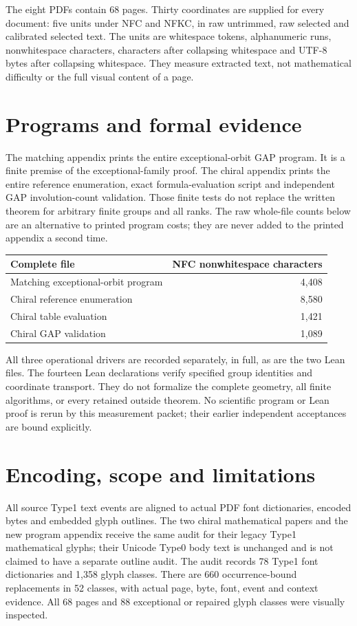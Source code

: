 \documentclass[11pt,a4paper]{article}
\begin{document}
The eight PDFs contain 68 pages. Thirty coordinates are supplied for every document: five units under NFC and NFKC, in raw untrimmed, raw selected and calibrated selected text. The units are whitespace tokens, alphanumeric runs, nonwhitespace characters, characters after collapsing whitespace and UTF-8 bytes after collapsing whitespace. They measure extracted text, not mathematical difficulty or the full visual content of a page.

\section*{Programs and formal evidence}
The matching appendix prints the entire exceptional-orbit GAP program. It is a finite premise of the exceptional-family proof. The chiral appendix prints the entire reference enumeration, exact formula-evaluation script and independent GAP involution-count validation. Those finite tests do not replace the written theorem for arbitrary finite groups and all ranks.
\newpage
The raw whole-file counts below are an alternative to printed program costs; they are never added to the printed appendix a second time.
\begin{center}\begin{tabular}{lr}\toprule
Complete file & NFC nonwhitespace characters\\\midrule
Matching exceptional-orbit program&4,408\\
Chiral reference enumeration&8,580\\
Chiral table evaluation&1,421\\
Chiral GAP validation&1,089\\\bottomrule
\end{tabular}\end{center}
All three operational drivers are recorded separately, in full, as are the two Lean files. The fourteen Lean declarations verify specified group identities and coordinate transport. They do not formalize the complete geometry, all finite algorithms, or every retained outside theorem. No scientific program or Lean proof is rerun by this measurement packet; their earlier independent acceptances are bound explicitly.

\section*{Encoding, scope and limitations}
All source Type1 text events are aligned to actual PDF font dictionaries, encoded bytes and embedded glyph outlines. The two chiral mathematical papers and the new program appendix receive the same audit for their legacy Type1 mathematical glyphs; their Unicode Type0 body text is unchanged and is not claimed to have a separate outline audit. The audit records 78 Type1 font dictionaries and 1,358 glyph classes. There are 660 occurrence-bound replacements in 52 classes, with actual page, byte, font, event and context evidence. All 68 pages and 88 exceptional or repaired glyph classes were visually inspected.
\end{document}
